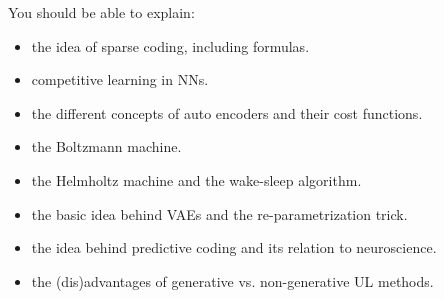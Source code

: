 \documentclass[main]{subfiles}
\begin{document}
You should be able to explain:
\begin{itemize}
 \item the idea of sparse coding, including formulas.
 \item competitive learning in NNs.
 \item the different concepts of auto encoders and their cost functions.
 \item the Boltzmann machine.
 \item the Helmholtz machine and the wake-sleep algorithm.
 \item the basic idea behind VAEs and the re-parametrization trick.
 \item the idea behind predictive coding and its relation to neuroscience.
 \item the (dis)advantages of generative vs. non-generative UL methods.
\end{itemize}
\end{document}
